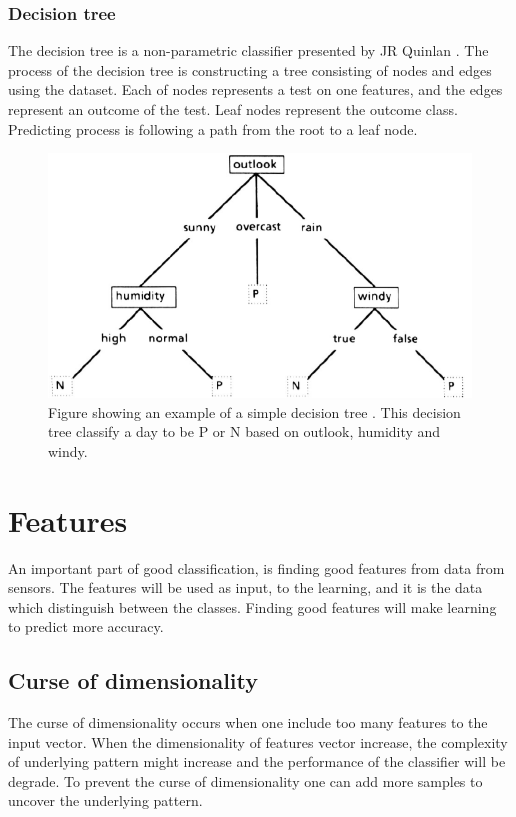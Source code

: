 \documentclass[USenglish]{ifimaster}  %
\begin{document}
\subsubsection{Decision tree}
The decision tree is a non-parametric classifier presented by JR Quinlan \cite{Quinlan1986}. The process of the decision tree is constructing a tree consisting of nodes and edges using the dataset. Each of nodes represents a test on one features, and the edges represent an outcome of the test. Leaf nodes represent the outcome class. Predicting process is following a path from the root to a leaf node.


\begin{figure}[h]
    \centering
    \includegraphics[scale=0.5]{Figures/decisionTree.PNG}
    \caption{Figure showing an example of a simple decision tree \cite{Quinlan1986}. This decision tree classify a day to be P or N based on outlook, humidity and windy.}
    \label{fig:SVM}
\end{figure}


\section{Features} \label{features}
An important part of good classification, is finding good features from data from sensors. The features will be used as input, to the learning, and it is the data which distinguish between the classes. Finding good features will make learning to predict more accuracy.

\subsection{Curse of dimensionality}
The curse of dimensionality occurs when one include too many features to the input vector. When the dimensionality of features vector increase, the complexity of underlying pattern might increase and the performance of the classifier will be degrade. To prevent the curse of dimensionality one can add more samples to uncover the underlying pattern.
\end{document}
